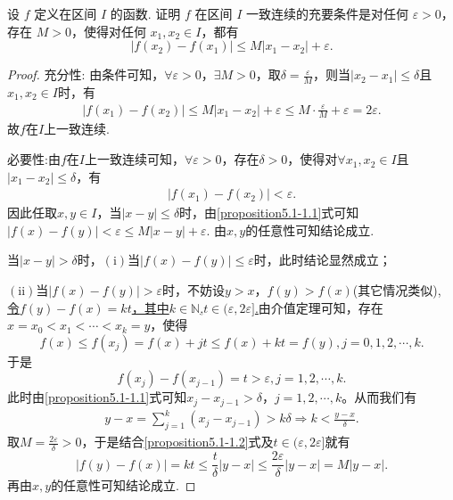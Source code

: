 \documentclass[lang=cn,newtx,10pt,scheme=chinese]{elegantbook}
\begin{document}
\begin{proposition}\label{proposition:一致连续的充要条件-一致连续与Lipschitz连续的关系}
   设 \(f\) 定义在区间 \(I\) 的函数. 证明 \(f\) 在区间 \(I\) 一致连续的充要条件是对任何 \(\varepsilon>0\)，存在 \(M > 0\)，使得对任何 \(x_1,x_2\in I\)，都有
   \[|f(x_2)-f(x_1)|\leq M|x_1 - x_2|+\varepsilon. \]
\end{proposition}
\begin{proof}
   {\heiti 充分性:} 由条件可知，\(\forall \varepsilon >0\)，\(\exists M>0\)，取\(\delta =\frac{\varepsilon}{M}\)，则当\(\vert x_2 - x_1\vert\leqslant \delta\)且$x_1,x_2\in I$时，有
\begin{align*}
\vert f(x_1) - f(x_2)\vert \leqslant M\vert x_1 - x_2\vert+\varepsilon
\leqslant M\cdot\frac{\varepsilon}{M}+\varepsilon
= 2\varepsilon.
\end{align*}
故\(f\)在\(I\)上一致连续. 

{\heiti 必要性:}由\(f\)在\(I\)上一致连续可知，\(\forall \varepsilon >0\)，存在\(\delta >0\)，使得对\(\forall x_1,x_2\in I\)且\(\vert x_1 - x_2\vert\leqslant \delta\)，有
\begin{align}
   \vert f(x_1) - f(x_2)\vert<\varepsilon. \label{proposition5.1-1.1}
\end{align}
因此任取\(x,y\in I\)，{\large {}}当\(\vert x - y\vert\leqslant \delta\)时，由\eqref{proposition5.1-1.1}式可知
\(
\vert f(x) - f(y)\vert<\varepsilon \leqslant M\vert x - y\vert+\varepsilon.
\)
由\(x,y\)的任意性可知结论成立.

{\large {}}当\(\vert x - y\vert>\delta\)时，\((\mathrm{i})\)当\(\vert f(x) - f(y)\vert\leqslant \varepsilon\)时，此时结论显然成立；

\((\mathrm{ii})\)当\(\vert f(x) - f(y)\vert>\varepsilon\)时，不妨设\(y > x\)，\(f(y) > f(x)\)(其它情况类似),
\hyperlink{k,t的存在性}{令\(f(y) - f(x) = kt\)，其中\(k\in \mathbb{N}\),\(t\in (\varepsilon,2\varepsilon]\).}由介值定理可知，存在\(x = x_0<x_1<\cdots <x_k = y\)，使得
\[
f(x) \leqslant f(x_j) = f(x) + jt\leqslant f(x) + kt = f(y), j = 0,1,2,\cdots,k.
\]
于是
\[
f(x_j) - f(x_{j - 1}) = t>\varepsilon, j = 1,2,\cdots,k.
\]
此时由\eqref{proposition5.1-1.1}式可知\(x_j - x_{j - 1}>\delta\)，\(j = 1,2,\cdots,k\)。从而我们有
\begin{align}
 y - x=\sum_{j = 1}^k{(x_j - x_{j - 1})}>k\delta \Rightarrow k<\frac{y - x}{\delta}. \label{proposition5.1-1.2}  
\end{align}
取\(M = \frac{2\varepsilon}{\delta}>0\)，于是结合\eqref{proposition5.1-1.2}式及\(t\in (\varepsilon,2\varepsilon]\)就有
\[
\vert f(y) - f(x)\vert=kt\leqslant \frac{t}{\delta}\vert y - x\vert\leqslant \frac{2\varepsilon}{\delta}\vert y - x\vert=M\vert y - x\vert.
\]
再由\(x,y\)的任意性可知结论成立.
\end{proof}
\end{document}

